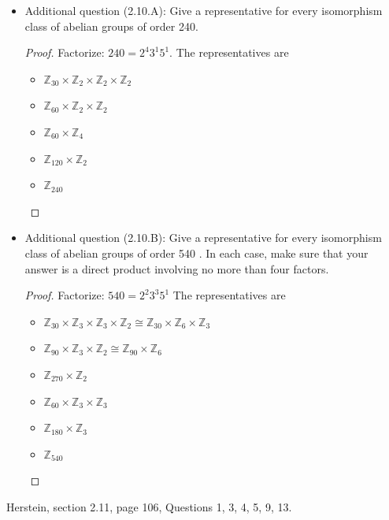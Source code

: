 \begin{itemize}
\begin{proof}
\end{proof}
\item
Additional question (2.10.A): Give a representative for every isomorphism class of abelian groups of order 240.
\begin{proof}
	Factorize: $240 = 2^4 3^1 5^1$.
	The representatives are
	\begin{itemize}
		\item $\mathbb{Z}_{30}\times \mathbb{Z}_{2}\times \mathbb{Z}_2 \times \mathbb{Z}_2$
		\item $\mathbb{Z}_{60}\times \mathbb{Z}_2 \times \mathbb{Z}_2$
		\item $\mathbb{Z}_{60}\times \mathbb{Z}_4 $
		\item $\mathbb{Z}_{120}\times \mathbb{Z}_2 $
		\item $\mathbb{Z}_{240}$
	\end{itemize}
\end{proof}
\item
Additional question (2.10.B): Give a representative for every isomorphism class of abelian groups of order 540 .
In each case, make sure that your answer is a direct product involving no more than four factors. 
\begin{proof}
	Factorize: $540 = 2^2 3^3 5^1$
	The representatives are
	\begin{itemize}
		\item $\mathbb{Z}_{30} \times \mathbb{Z}_3 \times \mathbb{Z}_3 \times \mathbb{Z}_2 \cong \mathbb{Z}_{30} \times \mathbb{Z}_6 \times \mathbb{Z}_3$
		\item $\mathbb{Z}_{90} \times \mathbb{Z}_3 \times \mathbb{Z}_2 \cong \mathbb{Z}_{90} \times \mathbb{Z}_6$
		\item $\mathbb{Z}_{270} \times \mathbb{Z}_2$
		\item $\mathbb{Z}_{60} \times \mathbb{Z}_3 \times \mathbb{Z}_3 $
		\item $\mathbb{Z}_{180} \times \mathbb{Z}_3 $
		\item $\mathbb{Z}_{540}$
	\end{itemize}
\end{proof}


\end{itemize}
\newpage
Herstein, section 2.11, page 106, Questions 1, 3, 4, 5, 9, 13.
